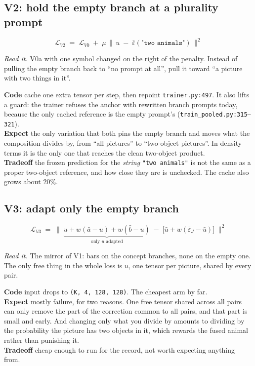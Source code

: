 \documentclass[11pt]{article}
\newcommand{\eps}{\varepsilon}
\newcommand{\shape}[1]{\texttt{(#1)}}
\newcommand{\B}[1]{\textbf{#1}}
\newcommand{\LL}{\mathcal{L}}
\newcommand{\sq}[1]{\Big\lVert #1 \Big\rVert^2}
\newcommand{\readit}[1]{\par\smallskip\noindent\textit{Read it.} #1}
\begin{document}
\subsection*{V2: hold the empty branch at a plurality prompt}
\begin{equation}
  \LL_{V2} \;=\; \LL_{V0} \;+\; \mu\,\sq{\,u \;-\; \bar\eps(\texttt{"two animals"})\,}
\end{equation}
\readit{V0a with one symbol changed on the right of the penalty. Instead of pulling the empty
branch back to ``no prompt at all'', pull it toward ``a picture with two things in it''.}

\noindent\B{Code} \quad cache one extra tensor per step, then repoint \texttt{trainer.py:497}. It
also lifts a guard: the trainer refuses the anchor with rewritten branch prompts today, because the
only cached reference is the empty prompt's (\texttt{train\_pooled.py:315--321}).\\
\B{Expect} \quad the only variation that both pins the empty branch and moves what the
composition divides by, from ``all pictures'' to ``two-object pictures''. In density terms it is
the only one that reaches the clean two-object product.\\
\B{Tradeoff} \quad the frozen prediction for the \emph{string} \texttt{"two animals"} is not the
same as a proper two-object reference, and how close they are is unchecked. The cache also grows
about 20\%.

\subsection*{V3: adapt only the empty branch}
\begin{equation}
  \LL_{V3} \;=\; \sq{\;\underbrace{u + w(\bar a-u) + w(\bar b-u)}_{\text{only } u \text{ adapted}}
  \;-\;\big[\bar u + w(\bar\eps_J - \bar u)\big]\;}
\end{equation}
\readit{The mirror of V1: bars on the concept branches, none on the empty one. The only free thing
in the whole loss is $u$, one tensor per picture, shared by every pair.}

\noindent\B{Code} \quad input drops to \shape{K, 4, 128, 128}. The cheapest arm by far.\\
\B{Expect} \quad mostly failure, for two reasons. One free tensor shared across all pairs can only
remove the part of the correction common to all pairs, and that part is small and early. And
changing only what you divide by amounts to dividing by the probability the picture has two objects
in it, which rewards the fused animal rather than punishing it.\\
\B{Tradeoff} \quad cheap enough to run for the record, not worth expecting anything from.
\end{document}
